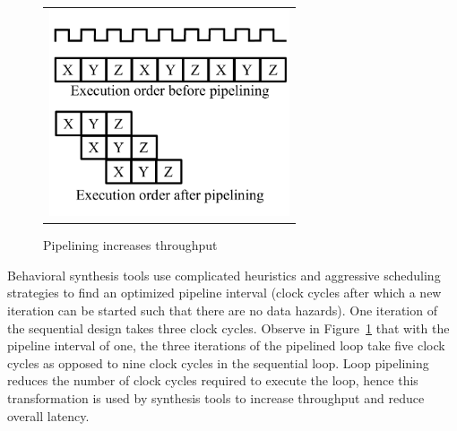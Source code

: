 \begin{figure}
\begin{center}
\begin{tabular}{c}
\includegraphics[height=2.4in]{fig-proposal/pp-clock-cycles}
\end{tabular}
\end{center}
\caption{Pipelining increases throughput}
\label{fig:high-level-synthesis-3}
\end{figure}


Behavioral synthesis tools use complicated heuristics and aggressive scheduling strategies 
to find an optimized pipeline interval (clock cycles after which a new iteration can 
be started such that there are no data hazards). One iteration of the sequential design takes three
clock cycles. Observe in Figure~\ref{fig:high-level-synthesis-3} that with the 
pipeline interval of one, the three iterations of the pipelined loop
take five clock cycles as opposed to nine clock cycles in the sequential loop.
Loop pipelining reduces the number of clock cycles required to execute the loop, 
hence this transformation is used by synthesis tools to increase throughput and reduce overall latency.



